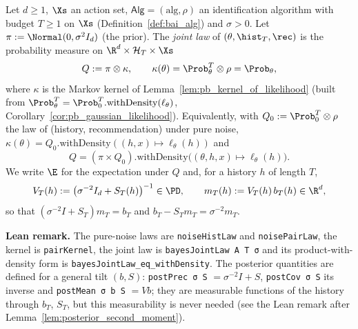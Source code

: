 \begin{definition}\label{def:bayes_joint}
\leanok
{}
Let $d\ge1$, $\Xs$ an action set, $\mathsf{Alg} = (\mathrm{alg},\rho)$ an identification algorithm
with budget $T\ge1$ on $\Xs$ (Definition~\ref{def:bai_alg}) and $\sigma>0$. Let
$\pi := \Normal(0,\sigma^2I_d)$ (the prior). The \emph{joint law} of $(\theta,\hist_T,\rec)$ is
the probability measure on $\R^d\times\mathcal{H}_T\times\Xs$
\[
  Q := \pi\otimes\kappa,\qquad \kappa(\theta) = \Prob_\theta^T\otimes\rho = \Prob_\theta ,
\]
where $\kappa$ is the Markov kernel of Lemma~\ref{lem:pb_kernel_of_likelihood} (built from
$\Prob_\theta^T = \Prob_0^T.\mathrm{withDensity}(\ell_\theta)$,
Corollary~\ref{cor:pb_gaussian_likelihood}). Equivalently, with $Q_0 := \Prob_0^T\otimes\rho$
the law of (history, recommendation) under pure noise,
$\kappa(\theta) = Q_0.\mathrm{withDensity}((h,x)\mapsto\ell_\theta(h))$ and
\[
  Q = (\pi\times Q_0).\mathrm{withDensity}\big((\theta,h,x)\mapsto\ell_\theta(h)\big) .
\]
We write $\E$ for the expectation under $Q$ and, for
a history $h$ of length $T$,
\[
  V_T(h) := \big(\sigma^{-2}I_d+S_T(h)\big)^{-1}\in\PD,\qquad m_T(h) := V_T(h)\,b_T(h)\in\R^d ,
\]
so that $(\sigma^{-2}I + S_T)m_T = b_T$ and $b_T - S_Tm_T = \sigma^{-2}m_T$.
\end{definition}

\textbf{Lean remark.} The pure-noise laws are \texttt{noiseHistLaw} and \texttt{noisePairLaw},
the kernel is \texttt{pairKernel}, the joint law is \texttt{bayesJointLaw A T σ} and its
product-with-density form is \texttt{bayesJointLaw\_eq\_withDensity}. The posterior quantities
are defined for a general tilt $(b, S)$: \texttt{postPrec σ S} $= \sigma^{-2}I + S$,
\texttt{postCov σ S} its inverse and \texttt{postMean σ b S} $= V b$; they are measurable
functions of the history through $b_T$, $S_T$, but this measurability is never needed (see the
Lean remark after Lemma~\ref{lem:posterior_second_moment}).

